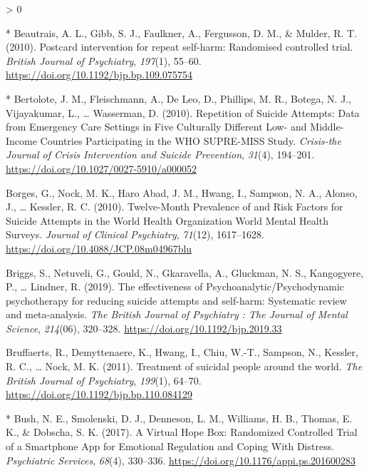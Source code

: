 \documentclass[
  english,
  man]{apa6}
\newlength{\cslhangindent}
\newenvironment{CSLReferences}[2] %
 {%
  \setlength{\parindent}{0pt}
  \ifodd #1 \everypar{\setlength{\hangindent}{\cslhangindent}}\ignorespaces\fi
  \ifnum #2 > 0
  \setlength{\parskip}{#2\baselineskip}
  \fi
 }%
 {}
\begin{document}
\begin{CSLReferences}{1}{0}
\leavevmode\hypertarget{ref-beautrais2010}{}%
* Beautrais, A. L., Gibb, S. J., Faulkner, A., Fergusson, D. M., \& Mulder, R. T. (2010). Postcard intervention for repeat self-harm: {Randomised} controlled trial. \emph{British Journal of Psychiatry}, \emph{197}(1), 55--60. \url{https://doi.org/10.1192/bjp.bp.109.075754}

\leavevmode\hypertarget{ref-bertolote2010}{}%
* Bertolote, J. M., Fleischmann, A., De Leo, D., Phillips, M. R., Botega, N. J., Vijayakumar, L., \ldots{} Wasserman, D. (2010). Repetition of {Suicide Attempts}: {Data} from {Emergency Care Settings} in {Five Culturally Different Low-} and {Middle-Income Countries Participating} in the {WHO SUPRE-MISS Study}. \emph{Crisis-the Journal of Crisis Intervention and Suicide Prevention}, \emph{31}(4), 194--201. \url{https://doi.org/10.1027/0027-5910/a000052}

\leavevmode\hypertarget{ref-borges2010}{}%
Borges, G., Nock, M. K., Haro Abad, J. M., Hwang, I., Sampson, N. A., Alonso, J., \ldots{} Kessler, R. C. (2010). Twelve-{Month Prevalence} of and {Risk Factors} for {Suicide Attempts} in the {World Health Organization World Mental Health Surveys}. \emph{Journal of Clinical Psychiatry}, \emph{71}(12), 1617--1628. \url{https://doi.org/10.4088/JCP.08m04967blu}

\leavevmode\hypertarget{ref-briggs2019}{}%
Briggs, S., Netuveli, G., Gould, N., Gkaravella, A., Gluckman, N. S., Kangogyere, P., \ldots{} Lindner, R. (2019). The effectiveness of {Psychoanalytic}/{Psychodynamic} psychotherapy for reducing suicide attempts and self-harm: {Systematic} review and meta-analysis. \emph{The British Journal of Psychiatry : The Journal of Mental Science}, \emph{214}(06), 320--328. \url{https://doi.org/10.1192/bjp.2019.33}

\leavevmode\hypertarget{ref-bruffaerts2011}{}%
Bruffaerts, R., Demyttenaere, K., Hwang, I., Chiu, W.-T., Sampson, N., Kessler, R. C., \ldots{} Nock, M. K. (2011). Treatment of suicidal people around the world. \emph{The British Journal of Psychiatry}, \emph{199}(1), 64--70. \url{https://doi.org/10.1192/bjp.bp.110.084129}

\leavevmode\hypertarget{ref-bush2017}{}%
* Bush, N. E., Smolenski, D. J., Denneson, L. M., Williams, H. B., Thomas, E. K., \& Dobscha, S. K. (2017). A {Virtual Hope Box}: {Randomized Controlled Trial} of a {Smartphone App} for {Emotional Regulation} and {Coping With Distress}. \emph{Psychiatric Services}, \emph{68}(4), 330--336. \url{https://doi.org/10.1176/appi.ps.201600283}


\end{CSLReferences}
\end{document}

